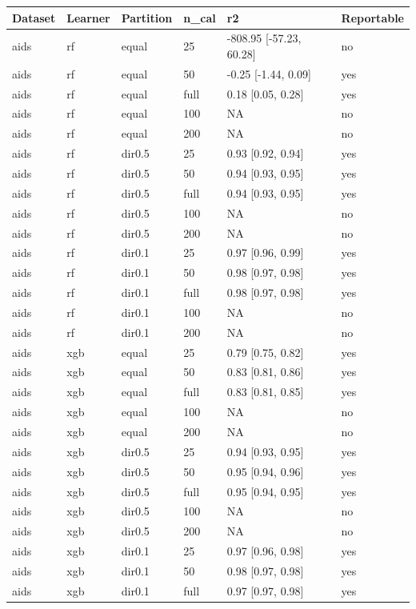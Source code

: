 \begin{tabular}{llllll}
\toprule
Dataset & Learner & Partition & n\_cal & r2 & Reportable \\
\midrule
aids & rf & equal & 25 & -808.95 [-57.23, 60.28] & no \\
aids & rf & equal & 50 & -0.25 [-1.44, 0.09] & yes \\
aids & rf & equal & full & 0.18 [0.05, 0.28] & yes \\
aids & rf & equal & 100 & NA & no \\
aids & rf & equal & 200 & NA & no \\
aids & rf & dir0.5 & 25 & 0.93 [0.92, 0.94] & yes \\
aids & rf & dir0.5 & 50 & 0.94 [0.93, 0.95] & yes \\
aids & rf & dir0.5 & full & 0.94 [0.93, 0.95] & yes \\
aids & rf & dir0.5 & 100 & NA & no \\
aids & rf & dir0.5 & 200 & NA & no \\
aids & rf & dir0.1 & 25 & 0.97 [0.96, 0.99] & yes \\
aids & rf & dir0.1 & 50 & 0.98 [0.97, 0.98] & yes \\
aids & rf & dir0.1 & full & 0.98 [0.97, 0.98] & yes \\
aids & rf & dir0.1 & 100 & NA & no \\
aids & rf & dir0.1 & 200 & NA & no \\
aids & xgb & equal & 25 & 0.79 [0.75, 0.82] & yes \\
aids & xgb & equal & 50 & 0.83 [0.81, 0.86] & yes \\
aids & xgb & equal & full & 0.83 [0.81, 0.85] & yes \\
aids & xgb & equal & 100 & NA & no \\
aids & xgb & equal & 200 & NA & no \\
aids & xgb & dir0.5 & 25 & 0.94 [0.93, 0.95] & yes \\
aids & xgb & dir0.5 & 50 & 0.95 [0.94, 0.96] & yes \\
aids & xgb & dir0.5 & full & 0.95 [0.94, 0.95] & yes \\
aids & xgb & dir0.5 & 100 & NA & no \\
aids & xgb & dir0.5 & 200 & NA & no \\
aids & xgb & dir0.1 & 25 & 0.97 [0.96, 0.98] & yes \\
aids & xgb & dir0.1 & 50 & 0.98 [0.97, 0.98] & yes \\
aids & xgb & dir0.1 & full & 0.97 [0.97, 0.98] & yes \\

\end{tabular}
